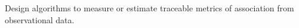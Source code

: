 \documentclass[10pt, onecolumn]{report}
\begin{document}
\begin{task}\label{task:estimate} 
Design algorithms to measure or estimate traceable metrics of association from 
observational data. 
\end{task}

%









\end{document}
